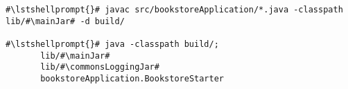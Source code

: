 \begin{lstlisting}[caption=Commands to compile and run the instrumented Bookstore under Windows,label=lst:bookstoreStarterWin]
#\lstshellprompt{}# javac src/bookstoreApplication/*.java -classpath lib/#\mainJar# -d build/

#\lstshellprompt{}# java -classpath build/;
       lib/#\mainJar#
       lib/#\commonsLoggingJar#
       bookstoreApplication.BookstoreStarter 
\end{lstlisting}
